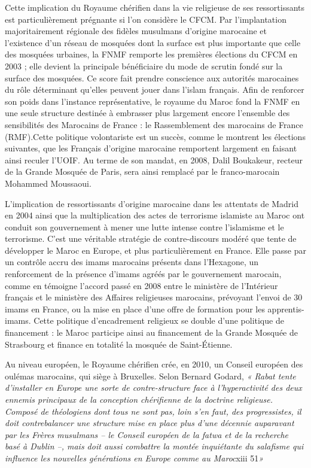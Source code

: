 Cette implication du Royaume chérifien dans la vie religieuse de ses
ressortissants est particulièrement prégnante si l'on considère le CFCM.
Par l'implantation majoritairement régionale des fidèles musulmans
d'origine marocaine et l'existence d'un réseau de mosquées dont la
surface est plus importante que celle des mosquées urbaines, la FNMF
remporte les premières élections du CFCM en 2003 ; elle devient la
principale bénéficiaire du mode de scrutin fondé sur la surface des
mosquées. Ce score fait prendre conscience aux autorités marocaines du
rôle déterminant qu'elles peuvent jouer dans l'islam français. Afin de
renforcer son poids dans l'instance représentative, le royaume du Maroc
fond la FNMF en une seule structure destinée à embrasser plus largement
encore l'ensemble des sensibilités des Marocains de France : le
Rassemblement des marocains de France (RMF).Cette politique volontariste
est un succès, comme le montrent les élections suivantes, que les
Français d'origine marocaine remportent largement en faisant ainsi
reculer l'UOIF. Au terme de son mandat, en 2008, Dalil Boukakeur,
recteur de la Grande Mosquée de Paris, sera ainsi remplacé par le
franco-marocain Mohammed Moussaoui.

L'implication de ressortissants d'origine marocaine dans les attentats
de Madrid en 2004 ainsi que la multiplication des actes de terrorisme
islamiste au Maroc ont conduit
son gouvernement à mener une lutte intense contre l'islamisme et le
terrorisme. C'est une véritable stratégie de contre-discours modéré que
tente de développer le Maroc en Europe, et plus particulièrement en
France. Elle passe par un contrôle accru des imams marocains présents
dans l'Hexagone, un renforcement de la présence d'imams agréés par le
gouvernement marocain, comme en témoigne l'accord passé en 2008 entre le
ministère de l'Intérieur français et le ministère des Affaires
religieuses marocains, prévoyant l'envoi de 30 imams en France, ou la
mise en place d'une offre de formation pour les apprentis-imams. Cette
politique d'encadrement religieux se double d'une politique de
financement : le Maroc participe ainsi au financement de la Grande
Mosquée de Strasbourg et finance en totalité la mosquée de
Saint-Étienne.

Au niveau européen, le Royaume chérifien crée, en 2010, un Conseil
européen des oulémas marocains, qui siège à Bruxelles. Selon Bernard
Godard, \emph{« Rabat tente d'installer en Europe une sorte de
contre-structure face à l'hyperactivité des deux ennemis principaux de
la conception chérifienne de la doctrine religieuse. Composé de
théologiens dont tous ne sont pas, loin s'en faut, des progressistes, il
doit contrebalancer une structure mise en place plus d'une décennie
auparavant par les Frères musulmans -- le Conseil européen de la fatwa
et de la recherche basé à Dublin --, mais doit aussi combattre la montée
inquiétante du salafisme qui influence les nouvelles générations en
Europe comme au Maroc}xiii 51\emph{»}

